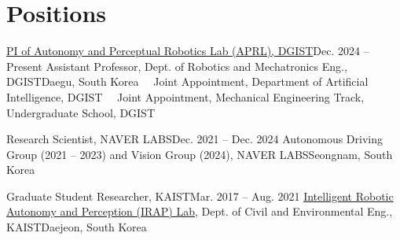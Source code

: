 \section{Positions}
  \resumeSubHeadingListStart
    \resumeSubheadingFourLines
      {\href{https://sites.google.com/view/aprl-dgist/home}{PI of Autonomy and Perceptual Robotics Lab (APRL), DGIST}}{Dec. 2024 -- Present}
      {Assistant Professor, Dept. of Robotics and Mechatronics Eng., DGIST}{Daegu, South Korea}
      { \ \ Joint Appointment, Department of Artificial Intelligence, DGIST}{ }
      { \ \ Joint Appointment, Mechanical Engineering Track, Undergraduate School, DGIST}{ }

    \vspace{1mm}
    \resumeSubheadingTwoLines
      {Research Scientist, NAVER LABS}{Dec. 2021 -- Dec. 2024}
      {Autonomous Driving Group (2021 -- 2023) and Vision Group (2024), NAVER LABS}{Seongnam, South Korea}

    \vspace{1mm}
    \resumeSubheadingTwoLines
      {Graduate Student Researcher, KAIST}{Mar. 2017 -- Aug. 2021}
      {\href{https://rpm.snu.ac.kr}{Intelligent Robotic Autonomy and Perception (IRAP) Lab}, Dept. of Civil and Environmental Eng., KAIST}{Daejeon, South Korea}

    \resumeSubHeadingListEnd